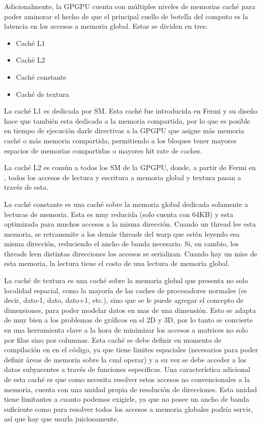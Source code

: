 Adicionalmente, la GPGPU cuenta con m\'ultiples niveles de memorias cach\'e para poder aminorar el hecho
de que el principal cuello de botella del computo es la latencia en los accesos a memoria global.
Estas se dividen en tres:

\begin{itemize}
  \item Cach\'e L1
  \item Cach\'e L2
  \item Cach\'e constante
  \item Cach\'e de textura
\end{itemize}

La cach\'e L1 es dedicada por SM. Esta cach\'e fue introducida en Fermi y su dise\~no hace que
tambi\'en esta dedicada a la memoria compartida, por lo que es posible en tiempo de ejecuci\'on
darle directivas a la GPGPU que asigne m\'as memoria cach\'e o m\'as memoria compartida,
permitiendo a los bloques tener mayores espacios de memorias compartidas o mayores hit rate de caches.

La cach\'e L2 es com\'un a todos los SM de la GPGPU, donde, a partir de Fermi en \nvidia, todos
los accesos de lectura y escritura a memoria global y textura pasan a trav\'es de esta. ~\cite{NvidiaFermi}

La cach\'e constante es una cach\'e sobre la memoria global dedicada solamente a lecturas de memoria. Esta
es muy reducida (solo cuenta con 64KB) y esta optimizada para muchos accesos a la misma direcci\'on. Cuando
un thread lee esta memoria, se retransmite a los dem\'as threads del warp que est\'en leyendo esa misma direcci\'on, reduciendo
el ancho de banda necesario. Si, en cambio, los threads leen distintas direcciones los accesos se serializan.
Cuando hay un miss de esta memoria, la lectura tiene el costo de una lectura de memoria global.

La cach\'e de textura es una cach\'e sobre la memoria global que presenta no solo localidad espacial,
como la mayor\'ia de las caches de procesadores normales (es decir, dato-1, dato, dato+1, etc.), sino que se le
puede agregar el concepto de dimensiones, para poder modelar datos en mas de una dimensi\'on.
Esto se adapta de muy bien a los problemas de gr\'aficos en el 2D y 3D, por lo tanto se convierte
en una herramienta clave a la hora de minimizar los accesos a matrices
no solo por filas sino por columnas. Esta cach\'e se debe definir en momento de compilaci\'on en
en el c\'odigo, ya que tiene limites espaciales (necesarios para poder definir \'areas de memoria
sobre la cual operar) y a su vez se debe acceder a los datos subyacentes a trav\'es de funciones especificas. Una caracter\'istica adicional
de esta cach\'e es que como necesita resolver estos accesos no convencionales a la memoria, cuenta
con una unidad propia de resoluci\'on de direcciones. Esta unidad tiene limitantes a cuanto podemos
exigirle, ya que no posee un ancho de banda suficiente como para resolver todos los
accesos a memoria globales podr\'ia servir, as\'i que hay que usarla juiciosamente.

